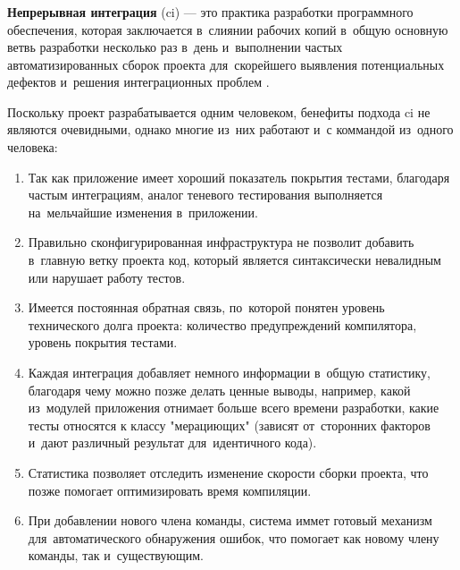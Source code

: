 \subsubsection{}
\label{sec:testing:ci:ci}

\textbf{Непрерывная интеграция} (\gls{ci}) — это практика разработки программного обеспечения, которая заключается в~слиянии рабочих копий в~общую основную ветвь разработки несколько раз в~день и~выполнении частых автоматизированных сборок проекта для~скорейшего выявления потенциальных дефектов и~решения интеграционных проблем \cite{wiki:ci}. 

Поскольку проект разрабатывается одним человеком, бенефиты подхода \gls{ci} не являются очевидными, однако многие из~них работают и~с коммандой из~одного человека:

\begin{enumerate}
	\item Так как приложение имеет хороший показатель покрытия тестами, благодаря частым интеграциям, аналог теневого тестирования выполняется на~мельчайшие изменения в~приложении.
	\item Правильно сконфигурированная инфраструктура не позволит добавить в~главную ветку проекта код, который является синтаксически невалидным или нарушает работу тестов.
	\item Имеется постоянная обратная связь, по~которой понятен уровень технического долга проекта: количество предупреждений компилятора, уровень покрытия тестами.
	\item Каждая интеграция добавляет немного информации в~общую статистику, благодаря чему можно позже делать ценные выводы, например, какой из~модулей приложения отнимает больше всего времени разработки, какие тесты относятся к классу "мерациющих" (зависят от~сторонних факторов и~дают различный результат для~идентичного кода).
	\item Статистика позволяет отследить изменение скорости сборки проекта, что позже помогает оптимизировать время компиляции.
	\item При добавлении нового члена команды, система иммет готовый механизм для~автоматического обнаружения ошибок, что помогает как новому члену команды, так и~существующим.
\end{enumerate}